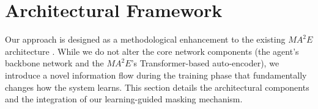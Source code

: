 
\section{Architectural Framework}
Our approach is designed as a methodological enhancement to the existing ${MA}^2E$ architecture \parencite{ma2e}. While we do not alter the core network components (the agent's backbone network and the ${MA}^2E$'s Transformer-based auto-encoder), we introduce a novel information flow during the training phase that fundamentally changes how the system learns. This section details the architectural components and the integration of our learning-guided masking mechanism.

